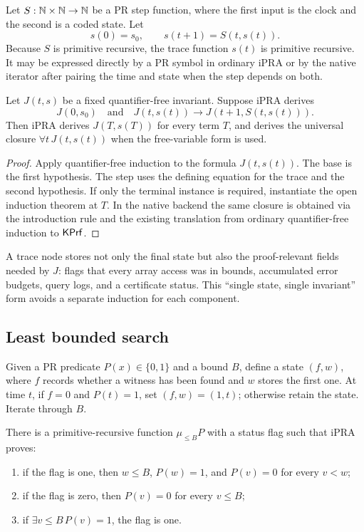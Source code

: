 Let \(S:\mathbb N\times\mathbb N\to\mathbb N\) be a PR step function, where the first input is the
clock and the second is a coded state.  Let
\[
  s(0)=s_0,\qquad s(t+1)=S(t,s(t)).
\]
Because \(S\) is primitive recursive, the trace function \(s(t)\) is primitive
recursive.  It may be expressed directly by a PR symbol in ordinary iPRA or by
the native iterator after pairing the time and state when the step depends on
both.

\begin{theorem}\label{thm:trace}
Let \(J(t,s)\) be a fixed quantifier-free invariant.  Suppose iPRA derives
\[
   J(0,s_0)
   \quad\text{and}\quad
   J(t,s(t))\to J(t+1,S(t,s(t))).
\]
Then iPRA derives \(J(T,s(T))\) for every term \(T\), and derives the universal
closure \(\forall t\,J(t,s(t))\) when the free-variable form is used.
\end{theorem}

\begin{proof}
Apply quantifier-free induction to the formula \(J(t,s(t))\).  The base is the
first hypothesis.  The step uses the defining equation for the trace and the
second hypothesis.  If only the terminal instance is required, instantiate the
open induction theorem at \(T\).  In the native backend the same closure is
obtained via the introduction rule and the existing translation from ordinary
quantifier-free induction to \(\mathsf{KPrf}\).
\end{proof}

A trace node stores not only the final state but also the proof-relevant fields
needed by \(J\): flags that every array access was in bounds, accumulated error
budgets, query logs, and a certificate status.  This ``single state, single
invariant'' form avoids a separate induction for each component.

\subsection{Least bounded search}

Given a PR predicate \(P(x)\in\{0,1\}\) and a bound \(B\), define a state
\((f,w)\), where \(f\) records whether a witness has been found and \(w\) stores
the first one.  At time \(t\), if \(f=0\) and \(P(t)=1\), set
\((f,w)=(1,t)\); otherwise retain the state.  Iterate through \(B\).

\begin{theorem}\label{thm:bounded-search}
There is a primitive-recursive function \(\mu_{\le B}P\) with a status flag such
that iPRA proves:
\begin{enumerate}
\item if the flag is one, then \(w\le B\), \(P(w)=1\), and
\(P(v)=0\) for every \(v<w\);
\item if the flag is zero, then \(P(v)=0\) for every \(v\le B\);
\item if \(\exists v\le B\,P(v)=1\), the flag is one.
\end{enumerate}
\end{theorem}

